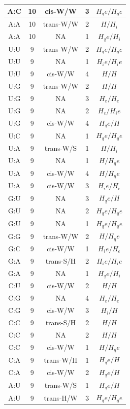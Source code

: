 \begin{center}
\begin{longtable}{c|c|c|c|c}
A:C & 10 & cis-W/W & 3 & $H_qe/H_qe$ \\  \hline
A:A & 10 & trans-W/W & 2 & $H/H_i$ \\  \hline
A:A & 10 & NA & 1 & $H_qe/H_i$ \\  \hline
U:U & 9 & trans-W/W & 2 & $H_qe/H_qe$ \\  \hline
U:U & 9 & NA & 1 & $H_ie/H_ie$ \\  \hline
U:U & 9 & cis-W/W & 4 & $H/H$ \\  \hline
U:G & 9 & trans-W/W & 2 & $H/H$ \\  \hline
U:G & 9 & NA & 3 & $H_e/H_e$ \\  \hline
U:G & 9 & NA & 2 & $H_e/H_ie$ \\  \hline
U:G & 9 & cis-W/W & 4 & $H_qe/H$ \\  \hline
U:C & 9 & NA & 1 & $H_qe/H_qe$ \\  \hline
U:A & 9 & trans-W/S & 1 & $H/H_i$ \\  \hline
U:A & 9 & NA & 1 & $H/H_qe$ \\  \hline
U:A & 9 & cis-W/W & 4 & $H/H_qe$ \\  \hline
U:A & 9 & cis-W/W & 3 & $H_ie/H_e$ \\  \hline
G:U & 9 & NA & 3 & $H_qe/H$ \\  \hline
G:U & 9 & NA & 2 & $H_qe/H_qe$ \\  \hline
G:U & 9 & NA & 1 & $H_qe/H_qe$ \\  \hline
G:G & 9 & trans-W/W & 2 & $H/H_qe$ \\  \hline
G:C & 9 & cis-W/W & 1 & $H_ie/H_e$ \\  \hline
G:A & 9 & trans-S/H & 2 & $H_ie/H_ie$ \\  \hline
G:A & 9 & NA & 1 & $H_qe/H_i$ \\  \hline
C:U & 9 & cis-W/W & 2 & $H/H$ \\  \hline
C:G & 9 & NA & 4 & $H_e/H_e$ \\  \hline
C:G & 9 & cis-W/W & 3 & $H_i/H$ \\  \hline
C:C & 9 & trans-S/H & 2 & $H/H$ \\  \hline
C:C & 9 & NA & 2 & $H/H$ \\  \hline
C:C & 9 & cis-W/W & 1 & $H/H_qe$ \\  \hline
C:A & 9 & trans-W/H & 1 & $H_qe/H$ \\  \hline
C:A & 9 & cis-W/W & 2 & $H_qe/H$ \\  \hline
A:U & 9 & trans-W/S & 1 & $H_qe/H$ \\  \hline
A:U & 9 & trans-H/W & 3 & $H_qe/H_qe$ \\  \hline

\end{longtable}
\end{center}
